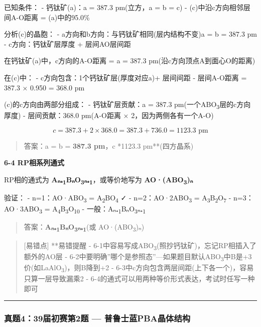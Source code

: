 已知条件：
- 钙钛矿(a)：a = 387.3 pm(立方，a = b = c)
- (c)中沿c方向相邻层间A-O距离 = (a)中的95.0\%

分析(c)的晶胞：
- a方向和b方向：与钙钛矿相同(层内结构不变)\箭 a = b = 387.3 pm
- c方向：钙钛矿层厚度 + 层间AO层间距

在钙钛矿(a)中，c方向的A-O距离 = a = 387.3 pm(沿c方向顶点A到面心O的距离)

在(c)中：
- c方向包含：1个钙钛矿层(厚度对应a)+ 层间间距
- 层间A-O距离 = 387.3 × 0.950 = 368.0 pm

(c)的c方向由两部分组成：
- 钙钛矿层贡献：a = 387.3 pm(一个ABO\textsubscript{3}层的c方向厚度)
- 层间贡献：368.0 pm(A-O距离 × 2，因为两侧各有一个A-O)

\[c = 387.3 + 2 \times 368.0 = 387.3 + 736.0 = 1123.3 \text{ pm}\]

\begin{quote}
答案：a = b = \textbf{387.3 pm}，c *1123.3 pm**(四方晶系)
\end{quote}

\textbf{6-4 RP相系列通式}

RP相的通式为 \textbf{Aₙ₊\textsubscript{1}BₙO\textsubscript{3}ₙ₊\textsubscript{1}}，或等价地写为 \textbf{AO·(ABO\textsubscript{3})ₙ}

验证：
- n=1：AO·ABO\textsubscript{3} = A\textsubscript{2}BO\textsubscript{4} ✓
- n=2：AO·2ABO\textsubscript{3} = A\textsubscript{3}B\textsubscript{2}O\textsubscript{7}
- n=3：AO·3ABO\textsubscript{3} = A\textsubscript{4}B\textsubscript{3}O\textsubscript{10}
- 一般：Aₙ₊\textsubscript{1}BₙO\textsubscript{3}ₙ₊\textsubscript{1}

\begin{quote}
答案：\textbf{Aₙ₊\textsubscript{1}BₙO\textsubscript{3}ₙ₊\textsubscript{1}}(或 AO·(ABO\textsubscript{3})ₙ)
\end{quote}

\begin{quote}
{[}易错点{]} **易错提醒
- 6-1中容易写成ABO\textsubscript{3}(照抄钙钛矿)，忘记RP相插入了额外的AO层
- 6-2中要明确''哪个是参照态''---如果题目默认ABO\textsubscript{3}中B是+3价(如LaAlO\textsubscript{3})，则B降到+2
- 6-3中c方向包含两层间距(上下各一个)，容易只算一层导致漏乘2
- 6-4的通式可以用两种等价形式表达，考试时任写一种即可
\end{quote}

\begin{center}\rule{0.5\linewidth}{0.5pt}\end{center}

\subsubsection{真题4：39届初赛第2题 --- 普鲁士蓝PBA晶体结构}\label{ux771fux9898439ux5c4aux521dux8d5bux7b2c2ux9898-ux666eux9c81ux58ebux84ddpbaux6676ux4f53ux7ed3ux6784}

